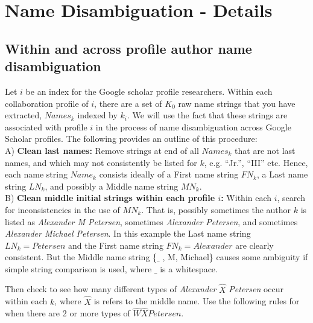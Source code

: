 \section{Name Disambiguation - Details}
\subsection{Within and across profile author name disambiguation}

Let $i$ be an index for the Google scholar profile researchers. Within each collaboration profile of $i$,  there are a set of $K_{0}$ raw name strings that you have extracted,  $Names_{k}$ indexed by $k_{i}$. We will use the fact that these strings are associated with profile $i$ in the process of name disambiguation across Google Scholar profiles. The following provides an outline of this procedure: \\


A) {\bf Clean last names:} 
Remove strings at end of all $Names_{k}$ that are not last names, and which may not consistently be listed for $k$, e.g. ``Jr.'', ``III'' etc. Hence, each name string  $Name_{k}$ consists ideally of a First name string $FN_{k}$, a Last name string $LN_{k}$, and possibly a Middle name string $MN_{k}$. \\

B)  {\bf Clean middle initial strings within each profile $i$:}  Within each $i$, search for inconsistencies in the use of $MN_{k}$. That is, possibly sometimes the author $k$ is listed as {\it Alexander M Petersen}, sometimes {\it Alexander Petersen}, and sometimes {\it Alexander Michael Petersen}. In this example the Last name string $LN_{k} = Petersen$ and the First name string $FN_{k} = Alexander$ are clearly consistent. But the Middle name string \{$\_$ , M, Michael\} causes some ambiguity if simple string comparison is used,  where $\_$ is a whitespace. 


Then check to see how many different types of {\it Alexander} $\hat X$ {\it Petersen} occur within each $k$, where $\hat X$ is refers to the middle name. Use the following rules for when there are 2 or more types of $\hat W \hat X Petersen$.
 
